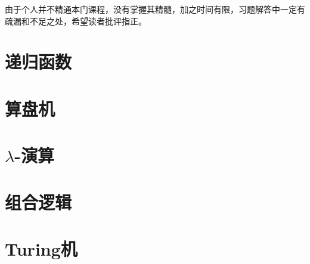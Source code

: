 \documentclass[a4paper,twoside]{article}
\begin{document}
由于个人并不精通本门课程，没有掌握其精髓，加之时间有限，习题解答中一定有疏漏和不足之处，希望读者批评指正。



\thispagestyle{empty}
\newpage
\thispagestyle{empty}
\setcounter{page}{1}
\section{递归函数}

























\newpage
\section{算盘机}





\newpage
\section{$\lambda$-演算}





























\newpage
\section{组合逻辑}










\newpage
\section{Turing机}




















\newpage
\end{document}
